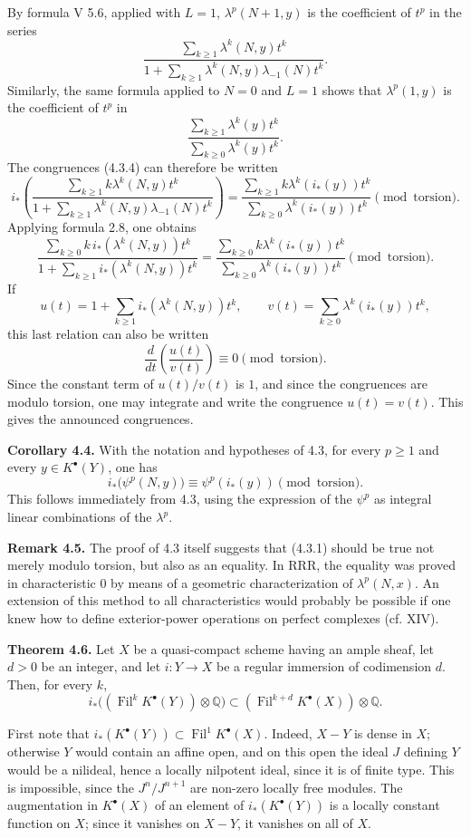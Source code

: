 \documentclass[11pt]{article}
\newcommand{\Fil}{\operatorname{Fil}}
\newcommand{\RRR}{\mathrm{RRR}}
\begin{document}
By formula V 5.6, applied with \(L=1\), \(\lambda^p(N+1,y)\) is the coefficient of \(t^p\) in the series
\[
  \frac{\sum_{k\ge1}\lambda^k(N,y)t^k}
       {1+\sum_{k\ge1}\lambda^k(N,y)\lambda_{-1}(N)t^k}.
\]
Similarly, the same formula applied to \(N=0\) and \(L=1\) shows that \(\lambda^p(1,y)\) is the coefficient of \(t^p\) in
\[
  \frac{\sum_{k\ge1}\lambda^k(y)t^k}
       {\sum_{k\ge0}\lambda^k(y)t^k}.
\]
The congruences (4.3.4) can therefore be written
\[
i_*\left(
  \frac{\sum_{k\ge1}k\lambda^k(N,y)t^k}
       {1+\sum_{k\ge1}\lambda^k(N,y)\lambda_{-1}(N)t^k}
\right)
=
  \frac{\sum_{k\ge1}k\lambda^k(i_*(y))t^k}
       {\sum_{k\ge0}\lambda^k(i_*(y))t^k}
       \pmod{\text{torsion}}.
\]
Applying formula 2.8, one obtains
\[
  \frac{\sum_{k\ge0}k\,i_*(\lambda^k(N,y))t^k}
       {1+\sum_{k\ge1} i_*(\lambda^k(N,y))t^k}
  =
  \frac{\sum_{k\ge0}k\lambda^k(i_*(y))t^k}
       {\sum_{k\ge0}\lambda^k(i_*(y))t^k}
       \pmod{\text{torsion}}.
\]
If
\[
  u(t)=1+\sum_{k\ge1}i_*(\lambda^k(N,y))t^k,\qquad
  v(t)=\sum_{k\ge0}\lambda^k(i_*(y))t^k,
\]
this last relation can also be written
\[
  \frac{d}{dt}\!\left(\frac{u(t)}{v(t)}\right)\equiv0
  \pmod{\text{torsion}}.
\]
Since the constant term of \(u(t)/v(t)\) is \(1\), and since the congruences are modulo torsion, one may integrate and write the congruence \(u(t)=v(t)\). This gives the announced congruences.

\textbf{Corollary 4.4.} With the notation and hypotheses of 4.3, for every \(p\ge1\) and every \(y\in K^\bullet(Y)\), one has
\[
  i_*\bigl(\psi^p(N,y)\bigr)\equiv \psi^p(i_*(y))
  \pmod{\text{torsion}}.
\]
This follows immediately from 4.3, using the expression of the \(\psi^p\) as integral linear combinations of the \(\lambda^p\).

\textbf{Remark 4.5.} The proof of 4.3 itself suggests that (4.3.1) should be true not merely modulo torsion, but also as an equality. In \(\RRR\), the equality was proved in characteristic \(0\) by means of a geometric characterization of \(\lambda^p(N,x)\). An extension of this method to all characteristics would probably be possible if one knew how to define exterior-power operations on perfect complexes (cf. XIV).

\textbf{Theorem 4.6.} Let \(X\) be a quasi-compact scheme having an ample sheaf, let \(d>0\) be an integer, and let \(i:Y\to X\) be a regular immersion of codimension \(d\). Then, for every \(k\),
\[
 i_*\bigl((\Fil^kK^\bullet(Y))\otimes\mathbb Q\bigr)
 \subset
 (\Fil^{k+d}K^\bullet(X))\otimes\mathbb Q.
\]

First note that \(i_*(K^\bullet(Y))\subset \Fil^1K^\bullet(X)\). Indeed, \(X-Y\) is dense in \(X\); otherwise \(Y\) would contain an affine open, and on this open the ideal \(J\) defining \(Y\) would be a nilideal, hence a locally nilpotent ideal, since it is of finite type. This is impossible, since the \(J^n/J^{n+1}\) are non-zero locally free modules. The augmentation in \(K^\bullet(X)\) of an element of \(i_*(K^\bullet(Y))\) is a locally constant function on \(X\); since it vanishes on \(X-Y\), it vanishes on all of \(X\).
\end{document}
